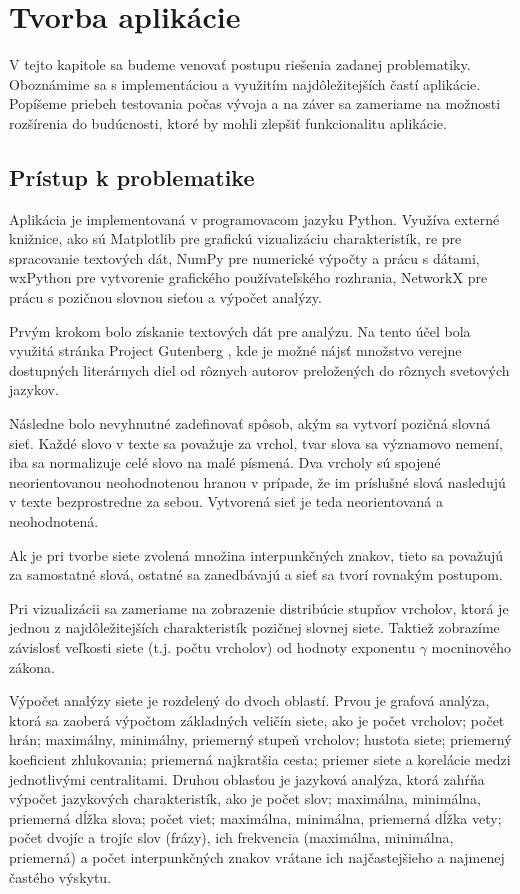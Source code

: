\chapter{Tvorba aplikácie}\label{ch:appCreation}

V tejto kapitole sa budeme venovať postupu riešenia zadanej problematiky. Oboznámime sa s implementáciou a využitím najdôležitejších
častí aplikácie. Popíšeme priebeh testovania počas vývoja a na záver sa zameriame na možnosti rozšírenia do budúcnosti, ktoré
by mohli zlepšiť funkcionalitu aplikácie.

\section{Prístup k problematike}\label{sec:solutionApproach}

Aplikácia je implementovaná v programovacom jazyku Python. Využíva externé knižnice, ako sú Matplotlib pre grafickú vizualizáciu
charakteristík, re pre spracovanie textových dát, NumPy pre numerické výpočty a prácu s dátami, wxPython pre vytvorenie grafického
používateľského rozhrania, NetworkX pre prácu s pozičnou slovnou sieťou a výpočet analýzy.

Prvým krokom bolo získanie textových dát pre analýzu. Na tento účel bola využitá stránka Project Gutenberg \cite{projectgutenberg} ,
kde je možné nájsť množstvo verejne dostupných literárnych diel od rôznych autorov preložených do rôznych svetových jazykov.

Následne bolo nevyhnutné zadefinovať spôsob, akým sa vytvorí pozičná slovná sieť. Každé slovo v texte sa považuje za vrchol,
tvar slova sa významovo nemení, iba sa normalizuje celé slovo na malé písmená. Dva vrcholy sú spojené neorientovanou neohodnotenou
hranou v prípade, že im príslušné slová nasledujú v texte bezprostredne za sebou. Vytvorená sieť je teda neorientovaná a neohodnotená.

Ak je pri tvorbe siete zvolená množina interpunkčných znakov, tieto sa považujú za samostatné slová, ostatné sa zanedbávajú a sieť sa tvorí
rovnakým postupom.

Pri vizualizácii sa zameriame na zobrazenie distribúcie stupňov vrcholov, ktorá je jednou z najdôležitejších charakteristík
pozičnej slovnej siete. Taktiež zobrazíme závislosť veľkosti siete (t.j. počtu vrcholov) od hodnoty exponentu $\gamma$ mocninového zákona.

Výpočet analýzy siete je rozdelený do dvoch oblastí. Prvou je grafová analýza, ktorá sa zaoberá výpočtom základných veličín siete, ako je
počet vrcholov; počet hrán; maximálny, minimálny, priemerný stupeň vrcholov; hustota siete; priemerný koeficient zhlukovania; priemerná
najkratšia cesta; priemer siete a korelácie medzi jednotlivými centralitami. Druhou oblasťou je jazyková analýza, ktorá zahŕňa výpočet
jazykových charakteristík, ako je počet slov; maximálna, minimálna, priemerná dĺžka slova; počet viet; maximálna, minimálna, priemerná dĺžka vety;
počet dvojíc a trojíc slov (frázy), ich frekvencia (maximálna, minimálna, priemerná) a počet interpunkčných znakov vrátane ich najčastejšieho a najmenej
častého výskytu.

